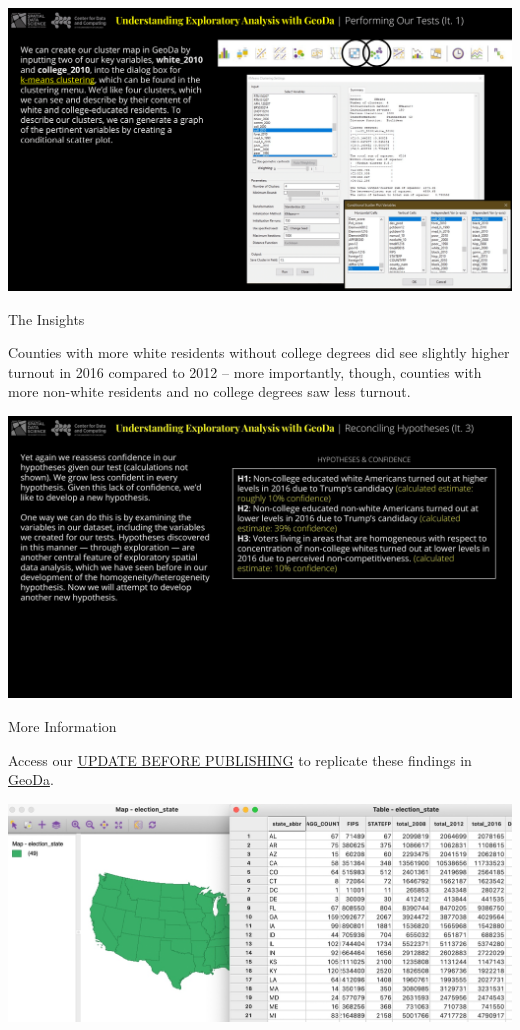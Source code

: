 \documentclass[
]{book}
\begin{document}
\includegraphics{images/elections4.png}

The Insights

Counties with more white residents without college degrees did see slightly higher turnout in 2016 compared to 2012 -- more importantly, though, counties with more non-white residents and no college degrees saw less turnout.

\includegraphics{images/elections5.jpg}

More Information

Access our \href{https://geodacenter.github.io/data-and-lab/snow/}{UPDATE BEFORE PUBLISHING} to replicate these findings in \href{https://geodacenter.github.io}{GeoDa}.

\includegraphics{images/elections6.jpg}
\end{document}
